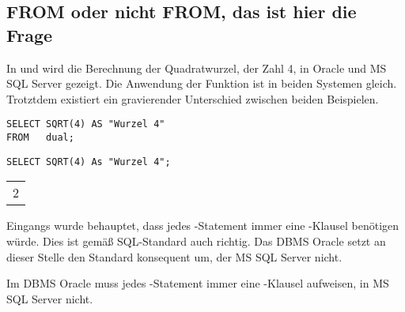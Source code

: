       \subsection{FROM oder nicht FROM, das ist hier die Frage}
        In  und  wird die Berechnung der
        Quadratwurzel, der Zahl 4, in Oracle und MS SQL Server gezeigt. Die
        Anwendung der Funktion  ist in beiden Systemen
        gleich. Trotztdem existiert ein gravierender Unterschied zwischen beiden
        Beispielen.
        \begin{lstlisting}[language=oracle_sql,caption={Berechnung der Quadartwurzel, der Zahl 4, in Oracle},label=sql03_12]
SELECT SQRT(4) AS "Wurzel 4"
FROM   dual;
        \end{lstlisting}
\clearpage
        \begin{lstlisting}[language=ms_sql,caption={Berechnung der Quadratwurzel, der Zahl 4, in MS SQL Server},label=sql03_13]
SELECT SQRT(4) As "Wurzel 4";
        \end{lstlisting}
        \begin{center}
          \begin{small}
            \tablehead{}
            \begin{msoraclesql}
              \begin{supertabular}{r}
                2 \\
              \end{supertabular}
            \end{msoraclesql}
          \end{small}
        \end{center}
        Eingangs wurde behauptet, dass jedes \SELECT-Statement immer eine
        \FROM-Klausel ben\"otigen w\"urde. Dies ist gem\"a\ss{} SQL-Standard
        auch richtig. Das DBMS Oracle setzt an dieser Stelle den Standard
        konsequent um, der MS SQL Server nicht.
        \begin{merke}
          Im DBMS Oracle muss jedes \SELECT-Statement immer eine \FROM-Klausel
          aufweisen, in MS SQL Server nicht.
        \end{merke}

